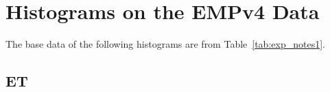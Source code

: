 \documentclass[10pt]{article}
\begin{document}
\newpage

\section{Histograms on the EMPv4 Data~\label{sec:empv4_hist}}
The base data of the following histograms are from Table~\ref{tab:exp_notes1}.

\subsection{ET}

\begin{figure}[hp!]
	\centering
\end{figure}
\end{document}
